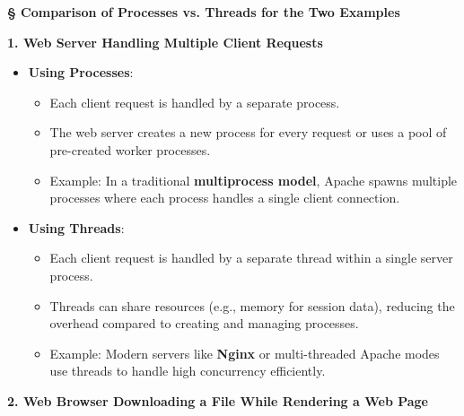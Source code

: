 \documentclass[a4paper]{book}
\newcommand{\sfbf}[1]{{\normalsize\textsf{\textbf{§ #1}}}}
\begin{document}
\sfbf{Comparison of Processes vs. Threads for the Two Examples}

\textbf{1. Web Server Handling Multiple Client Requests}

\begin{itemize}
\item 
\textbf{Using Processes}:
\begin{itemize}
\item 
Each client request is handled by a separate process.

\item 
The web server creates a new process for every request or uses a pool of pre-created worker processes.

\item 
Example: In a traditional \textbf{multiprocess model}, Apache spawns multiple processes where each process handles a single client connection.

\end{itemize}

\item 
\textbf{Using Threads}:

\begin{itemize}
\item 
Each client request is handled by a separate thread within a single server process.

\item 
Threads can share resources (e.g., memory for session data), reducing the overhead compared to creating and managing processes.

\item 
Example: Modern servers like \textbf{Nginx} or multi-threaded Apache modes use threads to handle high concurrency efficiently.

\end{itemize}

\end{itemize}

\hrulefill

\textbf{2. Web Browser Downloading a File While Rendering a Web Page}
\end{document}
